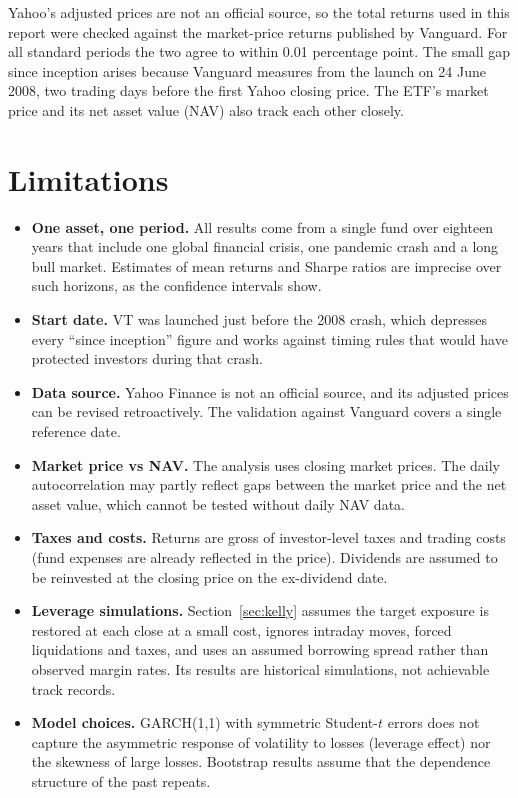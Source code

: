 \documentclass[11pt,a4paper]{article}
\newcommand{\keep}[1]{\Needspace{#1\baselineskip}}
\begin{document}
Yahoo's adjusted prices are not an official source, so the total returns used in this report were checked against the market-price returns published by Vanguard. For all standard periods the two agree to within 0.01 percentage point. The small gap since inception arises because Vanguard measures from the launch on 24 June 2008, two trading days before the first Yahoo closing price. The ETF's market price and its net asset value (NAV) also track each other closely.

\keep{20}
\section{Limitations}
\begin{itemize}[leftmargin=1.2em,itemsep=0.3em,topsep=0.2em]
  \item \textbf{One asset, one period.} All results come from a single fund over eighteen years that include one global financial crisis, one pandemic crash and a long bull market. Estimates of mean returns and Sharpe ratios are imprecise over such horizons, as the confidence intervals show.
  \item \textbf{Start date.} VT was launched just before the 2008 crash, which depresses every ``since inception'' figure and works against timing rules that would have protected investors during that crash.
  \item \textbf{Data source.} Yahoo Finance is not an official source, and its adjusted prices can be revised retroactively. The validation against Vanguard covers a single reference date.
  \item \textbf{Market price vs NAV.} The analysis uses closing market prices. The daily autocorrelation may partly reflect gaps between the market price and the net asset value, which cannot be tested without daily NAV data.
  \item \textbf{Taxes and costs.} Returns are gross of investor-level taxes and trading costs (fund expenses are already reflected in the price). Dividends are assumed to be reinvested at the closing price on the ex-dividend date.
  \item \textbf{Leverage simulations.} Section~\ref{sec:kelly} assumes the target exposure is restored at each close at a small cost, ignores intraday moves, forced liquidations and taxes, and uses an assumed borrowing spread rather than observed margin rates. Its results are historical simulations, not achievable track records.
  \item \textbf{Model choices.} GARCH(1,1) with symmetric Student-$t$ errors does not capture the asymmetric response of volatility to losses (leverage effect) nor the skewness of large losses. Bootstrap results assume that the dependence structure of the past repeats.
\end{itemize}
\end{document}
